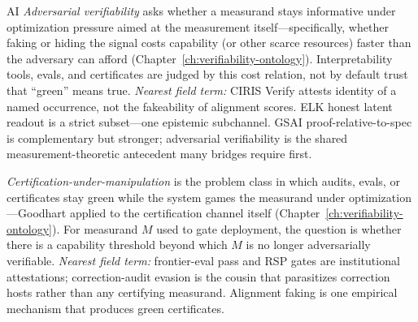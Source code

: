 \begin{authbar}{AI}
\emph{Adversarial verifiability} asks whether a measurand stays informative under optimization pressure aimed at the measurement itself---specifically, whether faking or hiding the signal costs capability (or other scarce resources) faster than the adversary can afford (Chapter~\ref{ch:verifiability-ontology}).
Interpretability tools, evals, and certificates are judged by this cost relation, not by default trust that ``green'' means true.
\emph{Nearest field term:} CIRIS Verify attests identity of a named occurrence, not the fakeability of alignment scores.
ELK honest latent readout is a strict subset---one epistemic subchannel.
GSAI proof-relative-to-spec is complementary but stronger; adversarial verifiability is the shared measurement-theoretic antecedent many bridges require first.

\emph{Certification-under-manipulation} is the problem class in which audits, evals, or certificates stay green while the system games the measurand under optimization---Goodhart applied to the certification channel itself (Chapter~\ref{ch:verifiability-ontology}).
For measurand \(M\) used to gate deployment, the question is whether there is a capability threshold beyond which \(M\) is no longer adversarially verifiable.
\emph{Nearest field term:} frontier-eval pass and RSP gates are institutional attestations; correction-audit evasion is the cousin that parasitizes correction hosts rather than any certifying measurand.
Alignment faking is one empirical mechanism that produces green certificates.

\end{authbar}
\authbarneedspace
